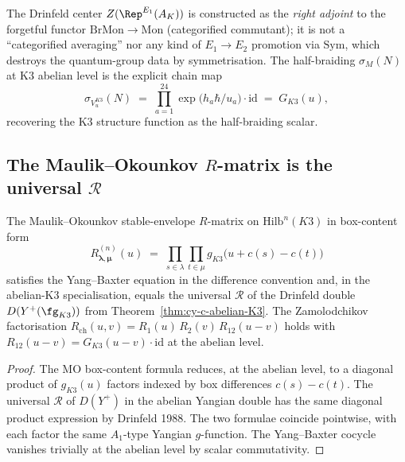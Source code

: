 \begin{remark}
\label{rem:drinfeld-center-right-adjoint}
The Drinfeld center $Z(\Rep^{E_1}(A_K))$ is constructed as the
\emph{right adjoint} to the forgetful functor $\mathrm{BrMon} \to
\mathrm{Mon}$ \textup{(}categorified commutant\textup{);} it is not a
``categorified averaging'' nor any kind of $E_1 \to E_2$ promotion via
$\mathrm{Sym}$, which destroys the quantum-group data by
symmetrisation. The half-braiding $\sigma_M(N)$
at K$3$ abelian level is the explicit chain map
\[
 \sigma_{V_u^{K3}}(N) \;=\; \prod_{a=1}^{24} \exp\!\bigl(h_a \hbar / u_a\bigr)
 \cdot \mathrm{id}
 \;=\; G_{K3}(u),
\]
recovering the K$3$ structure function as the half-braiding scalar.
\end{remark}

\subsection{The Maulik--Okounkov \texorpdfstring{$R$}{R}-matrix is the universal \texorpdfstring{$\mathcal{R}$}{R}}
\label{subsec:cy-c-MO-R-matrix}

\begin{theorem}[MO \texorpdfstring{$R$}{R}-matrix \texorpdfstring{$=$}{=} universal \texorpdfstring{$\mathcal{R}$}{R} of \texorpdfstring{$D(Y^+)$}{D(Y-+)}
 at K\texorpdfstring{$3$}{3} abelian level]
\label{thm:cy-c-MO-equals-universal-R}
The Maulik--Okounkov stable-envelope $R$-matrix on
$\mathrm{Hilb}^n(K3)$ in box-content form
\[
 R^{(n)}_{\boldsymbol{\lambda}, \boldsymbol{\mu}}(u)
 \;=\; \prod_{s \in \lambda} \prod_{t \in \mu}
 g_{K3}\bigl(u + c(s) - c(t)\bigr)
\]
satisfies the Yang--Baxter equation in the difference convention and,
in the abelian-K$3$ specialisation, equals the universal $\mathcal{R}$
of the Drinfeld double $D(Y^+(\fg_{K3}))$ from
Theorem~\ref{thm:cy-c-abelian-K3}. The Zamolodchikov factorisation
$R_{\mathrm{ch}}(u, v) = R_1(u)\, R_2(v)\, R_{12}(u - v)$ holds with
$R_{12}(u - v) = G_{K3}(u - v) \cdot \mathrm{id}$ at the abelian level.
\end{theorem}

\begin{proof}
The MO box-content formula reduces, at the abelian level, to a
diagonal product of $g_{K3}(u)$ factors indexed by box differences
$c(s) - c(t)$. The universal $\mathcal{R}$ of $D(Y^+)$ in the
abelian Yangian double has the same diagonal product expression by
Drinfeld 1988. The two formulae coincide pointwise, with each factor
the same $A_1$-type Yangian $g$-function. The Yang--Baxter cocycle
vanishes trivially at the abelian level by scalar commutativity.
\end{proof}

